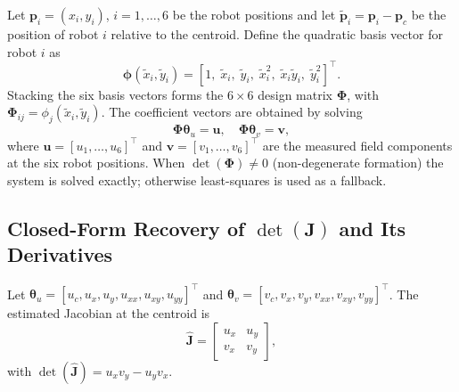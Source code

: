 \documentclass[lettersize,journal]{IEEEtran}
\begin{document}
Let $\mathbf{p}_i = (x_i, y_i)$, $i = 1, \ldots, 6$ be the robot positions and
let $\tilde{\mathbf{p}}_i = \mathbf{p}_i - \mathbf{p}_c$ be the position of
robot $i$ relative to the centroid. Define the quadratic basis vector for robot
$i$ as
\begin{equation}
    \boldsymbol{\phi}(\tilde{x}_i, \tilde{y}_i) =
    [1, \; \tilde{x}_i, \; \tilde{y}_i, \; \tilde{x}_i^2, \;
    \tilde{x}_i \tilde{y}_i, \; \tilde{y}_i^2]^\top. \label{eq:basis}
\end{equation}
Stacking the six basis vectors forms the $6 \times 6$ design matrix
$\boldsymbol{\Phi}$, with $\boldsymbol{\Phi}_{ij} =
\phi_j(\tilde{x}_i, \tilde{y}_i)$.
The coefficient vectors are obtained by solving
\begin{equation}
    \boldsymbol{\Phi} \boldsymbol{\theta}_u = \mathbf{u}, \quad
    \boldsymbol{\Phi} \boldsymbol{\theta}_v = \mathbf{v}, \label{eq:solve}
\end{equation}
where $\mathbf{u} = [u_1, \ldots, u_6]^\top$ and $\mathbf{v} = [v_1, \ldots,
v_6]^\top$ are the measured field components at the six robot positions. When
$\det(\boldsymbol{\Phi}) \neq 0$ (non-degenerate formation) the system is solved
exactly; otherwise least-squares is used as a fallback.

\subsection{Closed-Form Recovery of $\det(\mathbf{J})$ and Its Derivatives}

Let $\boldsymbol{\theta}_u = [u_c, u_x, u_y, u_{xx}, u_{xy}, u_{yy}]^\top$
and $\boldsymbol{\theta}_v = [v_c, v_x, v_y, v_{xx}, v_{xy}, v_{yy}]^\top$.
The estimated Jacobian at the centroid is
\begin{equation}
    \hat{\mathbf{J}} =
    \begin{bmatrix} u_x & u_y \\ v_x & v_y \end{bmatrix}, \label{eq:J_hat}
\end{equation}
with $\det(\hat{\mathbf{J}}) = u_x v_y - u_y v_x$.
\end{document}
